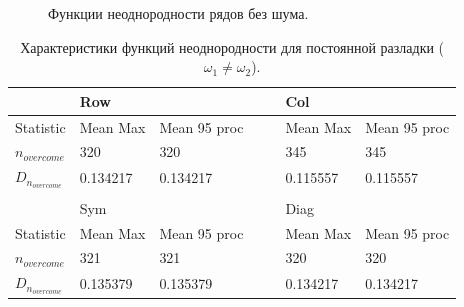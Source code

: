\documentclass[specialist, substylefile = spbu.rtx,
			   subf, href, 12pt]{disser}
\begin{document}
\newpage
\begin{figure}[!hhh]
	\caption{Функции неоднородности рядов без шума.}
	\label{pic:HeterFuncsWithoutNoise}
\end{figure}


\newpage
\begin{table}[!hhh]
	\center
	\caption{Характеристики функций неоднородности для постоянной разладки ($\omega_1 \neq \omega_2$).}
	\small
	\begin{tabular}{l|lll|lll}
		 				   & Row		  	  & 			 &&  & 	Col	      & 			      \\
		 				   \hline
		 Statistic        & Mean Max 	  & Mean 95 proc && 	& Mean Max     & Mean 95 proc     \\
		 $n_{overcome}$   & 320   	  & 320      &&     & 345       & 345 		  \\
		$D_{n_{overcome}}$& 0.134217		  &	0.134217	 &&     & 0.115557		  &   0.115557             \\
		&&&&&& \\
		  				   & Sym		  	  & 			 && & Diag		      & 			      \\
		  				   \hline
		 Statistic        & Mean Max 	  & Mean 95 proc && 	& Mean Max     & Mean 95 proc     \\
		 $n_{overcome}$   & 321   	  & 321      &&     & 320      & 320		  \\
		$D_{n_{overcome}}$& 0.135379		  &	0.135379		 &&     & 0.134217		 &0.134217                   \\
	\end{tabular}
	\label{tab:PermanentHeterogeneity}
\end{table}
\end{document}
